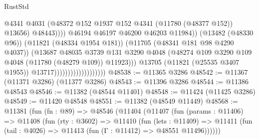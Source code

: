 \begin{lexlean}{RustStd}
\begin{coremodule}
                                                        @4341
                                                        @4031
                                                        (@48372
                                                          @152
                                                          @1937
                                                          @152
                                                          @4341
                                                          (@11780 (@48377 @152))
                                                          @13656)
                                                        @48443))))
                                                @46194
                                                @46197
                                                @46200
                                                @46203
                                                @11984))
                                            (@13482 (@48330 @96))
                                            (@11821 (@48334 @1954 @181))
                                            (@11705 (@48341 @181 @98 @4290 @4037))
                                            (@13687
                                              @48035
                                              @3739
                                              @131
                                              @3290
                                              @4048
                                              (@48274
                                                @109
                                                @3290
                                                @109
                                                @4048
                                                (@11780 (@48279 @109))
                                                @11923)))
                                          @13705
                                          (@11821 (@25535 @3407 @1955))
                                          @13717)))))))))))))))))))
@48538 := @11365 @3286
@48542 := @11367 (@11371 @3286) (@11377 @3286)
@48543 := @11396 @3286
@48544 := @11386 @48543
@48546 := @11382 (@48544 @11401)
@48548 := @11424 (@11425 @3286)
@48549 := @11420 @48548
@48551 := @11382 (@48549 @11449)
@48568 := @11381
    (fun (fn : @89) =>
    @48546
      (@11404
        (@11407
          (fun (params : @11406) =>
          @11408
            (fun (rty : @3602) =>
            @11410
              (fun (lets : @11409) =>
              @11411 (fun (tail : @4026) => @11413 (fun (Γ : @11412) => @48551 @11496))))))

\end{coremodule}
\end{lexlean}
